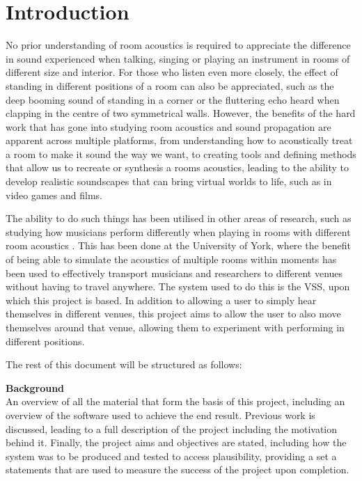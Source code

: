 \documentclass[../../main.tex]{subfiles}
\begin{document}
\section{Introduction}

	No prior understanding of room acoustics is required to appreciate the difference in sound experienced when talking, singing or playing an instrument in rooms of different size and interior. For those who listen even more closely, the effect of standing in different positions of a room can also be appreciated, such as the deep booming sound of standing in a corner or the fluttering echo heard when clapping in the centre of two symmetrical walls. However, the benefits of the hard work that has gone into studying room acoustics and sound propagation are apparent across multiple platforms, from understanding how to acoustically treat a room to make it sound the way we want, to creating tools and defining methods that allow us to recreate or synthesis a rooms acoustics, leading to the ability to develop realistic soundscapes that can bring virtual worlds to life, such as in video games and films.

	The ability to do such things has been utilised in other areas of research, such as studying how musicians perform differently when playing in rooms with different room acoustics \cite{Brereton2014}. This has been done at the University of York, where the benefit of being able to simulate the acoustics of multiple rooms within moments has been used to effectively transport musicians and researchers to different venues without having to travel anywhere. The system used to do this is the \ac{VSS}, upon which this project is based. In addition to allowing a user to simply hear themselves in different venues, this project aims to allow the user to also move themselves around that venue, allowing them to experiment with performing in different positions.

	The rest of this document will be structured as follows:

	\textbf{Background}\\
		An overview of all the material that form the basis of this project, including an overview of the software used to achieve the end result. Previous work is discussed, leading to a full description of the project including the motivation behind it. Finally, the project aims and objectives are stated, including how the system was to be produced and tested to access plausibility, providing a set a statements that are used to measure the success of the project upon completion.
\end{document}
